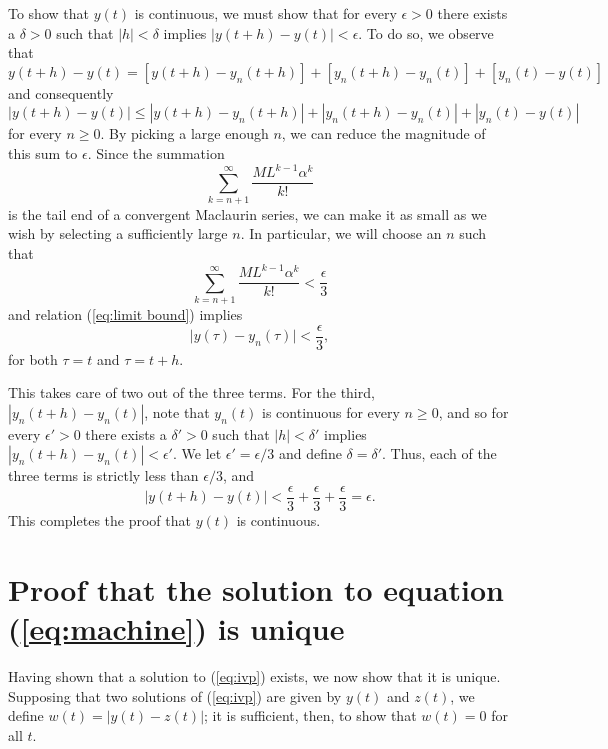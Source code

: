 \documentclass{myart}
\newcommand{\eq}[1]{(\ref{eq:#1})}
\begin{document}
To show that $y(t)$ is continuous, we must show that for every
$\epsilon > 0$ there exists a $\delta > 0$ such that $|h| < \delta$
implies $|y(t + h) - y(t)| < \epsilon$. To do so, we observe that
\begin{equation*}
  y(t + h) - y(t)
= [y(t + h) - y_n(t + h)] + [y_n(t + h) - y_n(t)] + [y_n(t) - y(t)]
\end{equation*}
and consequently
\begin{equation*}
     |y(t + h) - y(t)|
\leq |y(t + h) - y_n(t + h)| + |y_n(t + h) - y_n(t)| + |y_n(t) - y(t)|
\end{equation*}
for every $n \geq 0$. By picking a large enough $n$, we can reduce the
magnitude of this sum to $\epsilon$. Since the summation
\begin{equation*}
\sum_{k=n+1}^\infty \frac{ML^{k-1}\alpha^k}{k!}
\end{equation*}
is the tail end of a convergent Maclaurin series, we can make it as
small as we wish by selecting a sufficiently large $n$. In particular,
we will choose an $n$ such that
\begin{equation*}
\sum_{k=n+1}^\infty \frac{ML^{k-1}\alpha^k}{k!} < \frac{\epsilon}{3}
\end{equation*}
and relation \eq{limit bound} implies
\begin{equation*}
\Big|y(\tau) - y_n(\tau)\Big| < \frac{\epsilon}{3},
\end{equation*}
for both $\tau = t$ and $\tau = t + h$.

This takes care of two out of the three terms. For the third, $|y_n(t
+ h) - y_n(t)|$, note that $y_n(t)$ is continuous for every $n \geq
0$, and so for every $\epsilon' > 0$ there exists a $\delta' > 0$ such
that $|h| < \delta'$ implies $|y_n(t + h) - y_n(t)| < \epsilon'$. We
let $\epsilon' = \epsilon/3$ and define $\delta = \delta'$. Thus, each
of the three terms is strictly less than $\epsilon/3$, and
\begin{equation*}
  |y(t + h) - y(t)|
<   \frac{\epsilon}{3}
  + \frac{\epsilon}{3}
  + \frac{\epsilon}{3}
= \epsilon.
\end{equation*}
This completes the proof that $y(t)$ is continuous.

\section{Proof that the solution to equation \eq{machine} is unique}

Having shown that a solution to \eq{ivp} exists, we now show that it
is unique. Supposing that two solutions of \eq{ivp} are given by
$y(t)$ and $z(t)$, we define $w(t) = |y(t) - z(t)|$; it is sufficient,
then, to show that $w(t) = 0$ for all $t$.
\end{document}
